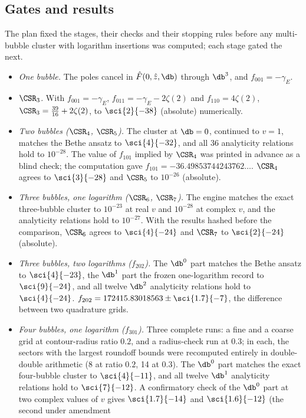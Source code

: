 \subsection{Gates and results}\label{sri:app:integ:gates}
The plan fixed the stages, their checks and their stopping rules before any multi-bubble cluster with logarithm
insertions was computed; each stage gated the
next.
\begin{itemize}
\item \emph{One bubble.} The poles cancel in $\hat F(0,\hat z,\db)$ through $\db^3$, and $f_{001}=-\gamma_E$.
\item \emph{$\CSR_3$.} With $f_{001}=-\gamma_E$, $f_{011}=-\gamma_E-2\zeta(2)$ and $f_{110}=4\zeta(2)$,
 $\CSR_3=\frac{39}{16}+2\zeta(2)$, to $\sci{2}{-38}$ (absolute) numerically.
\item \emph{Two bubbles ($\CSR_4$, $\CSR_5$).} The cluster at $\db=0$, continued to $v=1$, matches the Bethe ansatz to
 $\sci{4}{-32}$, and all 36 analyticity relations hold to $10^{-28}$. The value of $f_{101}$ implied by $\CSR_4$ was
 printed in advance as a blind check; the computation gave $f_{101}=-36.49853744243762\ldots$. $\CSR_4$ agrees to
 $\sci{3}{-28}$ and $\CSR_5$ to $10^{-26}$ (absolute).
\item \emph{Three bubbles, one logarithm ($\CSR_6$, $\CSR_7$).} The engine matches the exact three-bubble cluster to
 $10^{-23}$ at real $v$ and $10^{-28}$ at complex $v$, and the analyticity relations hold to $10^{-27}$. With the results
 hashed before the comparison, $\CSR_6$ agrees to $\sci{4}{-24}$ and $\CSR_7$ to $\sci{2}{-24}$ (absolute).
\item \emph{Three bubbles, two logarithms ($f_{202}$).} The $\db^0$ part matches the Bethe ansatz to $\sci{4}{-23}$, the
 $\db^1$ part the frozen one-logarithm record to $\sci{9}{-24}$, and all twelve $\db^2$ analyticity relations hold to
 $\sci{4}{-24}$. $f_{202}=172415.83018563\pm\sci{1.7}{-7}$, the difference between two quadrature grids.
\item \emph{Four bubbles, one logarithm ($f_{301}$).} Three complete runs: a fine and a coarse grid at contour-radius
 ratio $0.2$, and a radius-check run at $0.3$; in each, the sectors with the largest roundoff bounds were recomputed
 entirely in double-double arithmetic (8 at ratio $0.2$, 14 at $0.3$). The $\db^0$ part matches the exact four-bubble
 cluster to $\sci{4}{-11}$, and all twelve $\db^1$ analyticity relations hold to $\sci{7}{-12}$. A confirmatory check of
 the $\db^0$ part at two complex values of $v$ gives $\sci{1.7}{-14}$ and $\sci{1.6}{-12}$ (the second under amendment

\end{itemize}

